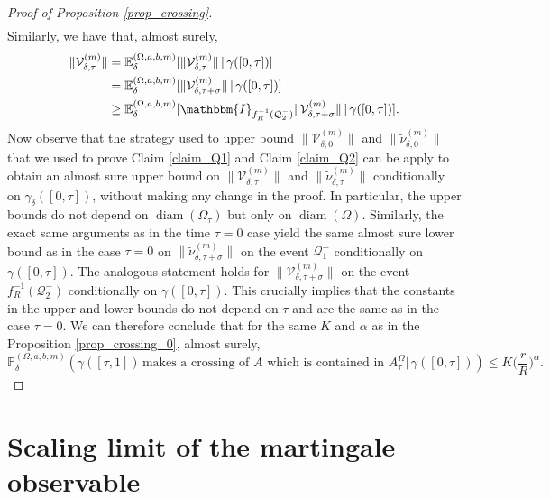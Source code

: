 \documentclass{article}
\newcommand{\PP}{{\mathbb{P}}}
\newcommand{\EE}{{\mathbb{E}}}
\theoremstyle{definition}
\theoremstyle{remark}
\theoremstyle{remark}
\begin{document}
\begin{proof}[Proof of Proposition \ref{prop_crossing}]
\begin{align*}
\end{align*}
Similarly, we have that, almost surely,
\begin{align*}
    \| \mathcal{V}_{\delta,\tau}^{(m)} \| &= \EE_{\delta}^{(\Omega,a,b,m)}[\| \mathcal{V}_{\delta,\tau}^{(m)} \| \, \vert \,\gamma([0,\tau])] \\
    &= \EE_{\delta}^{(\Omega,a,b,m)}[\| \mathcal{V}_{\delta,\tau + \sigma}^{(m)} \| \, \vert \, \gamma([0,\tau])] \\
    &\geq \EE_{\delta}^{(\Omega,a,b,m)}[ \mathbbm{I}_{f_{R}^{-1}(\mathcal{Q}_{2}^{-})} \| \mathcal{V}_{\delta,\tau + \sigma}^{(m)} \| \, \vert \, \gamma([0,\tau])].
\end{align*}
Now observe that the strategy used to upper bound  $\| \mathcal{V}_{\delta,0}^{(m)} \|$ and $ \| \tilde \nu_{\delta,0}^{(m)} \|$ that we used to prove Claim \ref{claim_Q1} and Claim \ref{claim_Q2} can be apply to obtain an almost sure upper bound on $\| \mathcal{V}_{\delta,\tau}^{(m)} \|$ and $ \| \tilde \nu_{\delta,\tau}^{(m)} \|$ conditionally on $\gamma_{\delta}([0,\tau])$, without making any change in the proof. In particular, the upper bounds do not depend on $\operatorname{diam}(\Omega_{\tau})$ but only on $\operatorname{diam}(\Omega)$. Similarly, the exact same arguments as in the time $\tau=0$ case yield the same almost sure lower bound as in the case $\tau=0$ on $\| \tilde \nu_{\delta,\tau + \sigma}^{(m)} \|$ on the event $\mathcal{Q}_1^{-}$ conditionally on $\gamma([0,\tau])$. The analogous statement holds for $\| \mathcal{V}_{\delta,\tau + \sigma}^{(m)} \|$ on the event $f_R^{-1}(\mathcal{Q}_2^{-})$ conditionally on $\gamma([0,\tau])$. This crucially implies that the constants in the upper and lower bounds do not depend on $\tau$ and are the same as in the case $\tau=0$. We can therefore conclude that for the same $K$ and $\alpha$ as in the Proposition \ref{prop_crossing_0}, almost surely,
\begin{equation*}
    \PP_{\delta}^{(\Omega,a,b,m)}(\gamma([\tau,1]) \, \text{makes a crossing of $A$ which is contained in $A_{\tau}^{\Omega}$} \vert \, \gamma([0,\tau])) \leq K \bigg (\frac{r}{R}\bigg)^{\alpha}.
\end{equation*} 
\end{proof}

\section{Scaling limit of the martingale observable} \label{sec_martobs}
\end{document}

